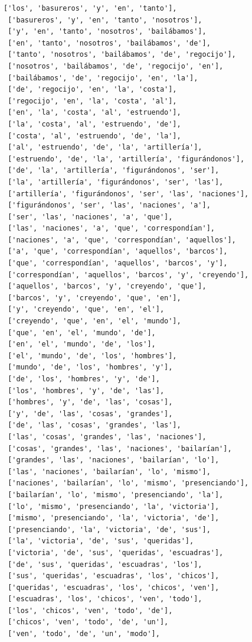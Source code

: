 \documentclass[11pt]{article}
\begin{document}
\begin{tcolorbox}[breakable, size=fbox, boxrule=1pt, pad at break*=1mm,colback=cellbackground, colframe=cellborder]
\begin{Verbatim}[commandchars=\\\{\}]
 ['los', 'basureros', 'y', 'en', 'tanto'],
 ['basureros', 'y', 'en', 'tanto', 'nosotros'],
 ['y', 'en', 'tanto', 'nosotros', 'bailábamos'],
 ['en', 'tanto', 'nosotros', 'bailábamos', 'de'],
 ['tanto', 'nosotros', 'bailábamos', 'de', 'regocijo'],
 ['nosotros', 'bailábamos', 'de', 'regocijo', 'en'],
 ['bailábamos', 'de', 'regocijo', 'en', 'la'],
 ['de', 'regocijo', 'en', 'la', 'costa'],
 ['regocijo', 'en', 'la', 'costa', 'al'],
 ['en', 'la', 'costa', 'al', 'estruendo'],
 ['la', 'costa', 'al', 'estruendo', 'de'],
 ['costa', 'al', 'estruendo', 'de', 'la'],
 ['al', 'estruendo', 'de', 'la', 'artillería'],
 ['estruendo', 'de', 'la', 'artillería', 'figurándonos'],
 ['de', 'la', 'artillería', 'figurándonos', 'ser'],
 ['la', 'artillería', 'figurándonos', 'ser', 'las'],
 ['artillería', 'figurándonos', 'ser', 'las', 'naciones'],
 ['figurándonos', 'ser', 'las', 'naciones', 'a'],
 ['ser', 'las', 'naciones', 'a', 'que'],
 ['las', 'naciones', 'a', 'que', 'correspondían'],
 ['naciones', 'a', 'que', 'correspondían', 'aquellos'],
 ['a', 'que', 'correspondían', 'aquellos', 'barcos'],
 ['que', 'correspondían', 'aquellos', 'barcos', 'y'],
 ['correspondían', 'aquellos', 'barcos', 'y', 'creyendo'],
 ['aquellos', 'barcos', 'y', 'creyendo', 'que'],
 ['barcos', 'y', 'creyendo', 'que', 'en'],
 ['y', 'creyendo', 'que', 'en', 'el'],
 ['creyendo', 'que', 'en', 'el', 'mundo'],
 ['que', 'en', 'el', 'mundo', 'de'],
 ['en', 'el', 'mundo', 'de', 'los'],
 ['el', 'mundo', 'de', 'los', 'hombres'],
 ['mundo', 'de', 'los', 'hombres', 'y'],
 ['de', 'los', 'hombres', 'y', 'de'],
 ['los', 'hombres', 'y', 'de', 'las'],
 ['hombres', 'y', 'de', 'las', 'cosas'],
 ['y', 'de', 'las', 'cosas', 'grandes'],
 ['de', 'las', 'cosas', 'grandes', 'las'],
 ['las', 'cosas', 'grandes', 'las', 'naciones'],
 ['cosas', 'grandes', 'las', 'naciones', 'bailarían'],
 ['grandes', 'las', 'naciones', 'bailarían', 'lo'],
 ['las', 'naciones', 'bailarían', 'lo', 'mismo'],
 ['naciones', 'bailarían', 'lo', 'mismo', 'presenciando'],
 ['bailarían', 'lo', 'mismo', 'presenciando', 'la'],
 ['lo', 'mismo', 'presenciando', 'la', 'victoria'],
 ['mismo', 'presenciando', 'la', 'victoria', 'de'],
 ['presenciando', 'la', 'victoria', 'de', 'sus'],
 ['la', 'victoria', 'de', 'sus', 'queridas'],
 ['victoria', 'de', 'sus', 'queridas', 'escuadras'],
 ['de', 'sus', 'queridas', 'escuadras', 'los'],
 ['sus', 'queridas', 'escuadras', 'los', 'chicos'],
 ['queridas', 'escuadras', 'los', 'chicos', 'ven'],
 ['escuadras', 'los', 'chicos', 'ven', 'todo'],
 ['los', 'chicos', 'ven', 'todo', 'de'],
 ['chicos', 'ven', 'todo', 'de', 'un'],
 ['ven', 'todo', 'de', 'un', 'modo'],

\end{Verbatim}
\end{tcolorbox}
\end{document}
